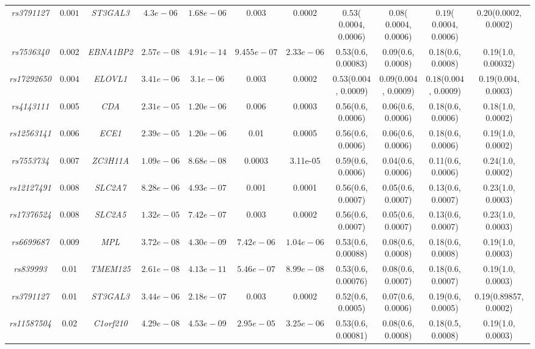 \documentclass[10pt]{article}
\begin{document}
{\begin{landscape}
\begin{table}[!htbp]
{\begin{tabular}{c c| c|c c c c| c c c c}
\textit{rs3791127} & $0.001$ & \textit{ST3GAL3} & $4.3e-06$ & $1.68e-06$& 0.003 & 0.0002 & $0.53$($0.0004$, $0.0006$) & $0.08$($0.0004$, $0.0006$) & $0.19$($0.0004$, $0.0006$) & $0.20$($0.0002$, $0.0002$) \tabularnewline

\textit{rs7536340} & 0.002& \textit{EBNA1BP2} & $2.57e-08$ & $4.91e-14$ & $9.455e-07$ & $2.33e-06$ & 0.53(0.6, 0.00083) & 0.09(0.6, 0.0008) & 0.18(0.6, 0.0008) & 0.19(1.0, 0.00032) \tabularnewline

\textit{rs17292650} & $0.004$ & \textit{ELOVL1} & $3.41e-06$ & $3.1e-06$ & 0.003 & 0.0002 & $0.53$($0.004$, $0.0009$) & $0.09$($0.004$, $0.0009$) & $0.18$($0.004$, $0.0009$) & $0.19$($0.004$, $0.0003$) \tabularnewline

\textit{rs4143111}& 0.005 &\textit{CDA} & $2.31e-05$ & $1.20e-06$ & 0.006 & 0.0003 & 0.56(0.6, 0.0006) & 0.06(0.6, 0.0006) & 0.18(0.6, 0.0006) & 0.18(1.0, 0.0002) \tabularnewline

\textit{rs12563141} & 0.006 & \textit{ECE1} & $2.39e-05$ & $1.20e-06$ & 0.01 & 0.0005 & 0.56(0.6, 0.0006) & 0.06(0.6, 0.0006) & 0.18(0.6, 0.0006) & 0.19(1.0, 0.0002) \tabularnewline

\textit{rs7553734} &0.007 &\textit{ZC3H11A} & $1.09e-06$ & $8.68e-08$ & 0.0003 & 3.11e-05 & 0.59(0.6, 0.0006) & 0.04(0.6, 0.0006) & 0.11(0.6, 0.0006) & 0.24(1.0, 0.0002) \tabularnewline

\textit{rs12127491} & 0.008 & \textit{SLC2A7} & $8.28e-06$ & $4.93e-07$ & 0.001 & 0.0001 & 0.56(0.6, 0.0007) & 0.05(0.6, 0.0007) & 0.13(0.6, 0.0007) & 0.23(1.0, 0.0003) \tabularnewline

\textit{rs17376524} & 0.008 & \textit{SLC2A5} & $1.32e-05$ & $7.42e-07$ & 0.003 & 0.0002 & 0.56(0.6, 0.0007) & 0.05(0.6, 0.0007) & 0.13(0.6, 0.0007) & 0.23(1.0, 0.0003) \tabularnewline

\textit{rs6699687} & 0.009 & \textit{MPL} & $3.72e-08$ & $4.30e-09$ & $7.42e-06$ & $1.04e-06$ & 0.53(0.6, 0.00088) & 0.08(0.6, 0.0008) & 0.18(0.6, 0.0008) & 0.19(1.0, 0.0003) \tabularnewline

\textit{rs839993} & 0.01 & \textit{TMEM125} & $2.61e-08$ & $4.13e-11$ & $5.46e-07$ & $8.99e-08$ & 0.53(0.6, 0.00076) & 0.08(0.6, 0.0007) & 0.18(0.6, 0.0007) & 0.19(1.0, 0.0003) \tabularnewline

\textit{rs3791127} & 0.01 &\textit{ST3GAL3} & $3.44e-06$ & $2.18e-07$ & 0.003 & 0.0002 & 0.52(0.6, 0.0005) & 0.07(0.6, 0.0006) & 0.19(0.6, 0.0005) & 0.19(0.89857, 0.0002) \tabularnewline

\textit{rs11587504} & 0.02 &\textit{C1orf210} & $4.29e-08$ & $4.53e-09$ & $2.95e-05$ & $3.25e-06$ & 0.53(0.6, 0.00081) & 0.08(0.6, 0.0008) & 0.18(0.5, 0.0008) & 0.19(1.0, 0.0003) \tabularnewline


\end{tabular}}
\end{table}
\end{landscape}}
\end{document}
